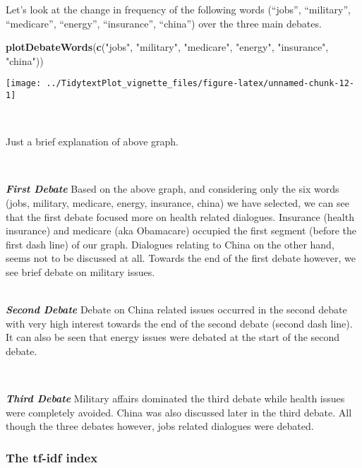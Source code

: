 \documentclass[
]{article}
\newenvironment{Shaded}{\begin{snugshade}}{\end{snugshade}}
\newcommand{\KeywordTok}[1]{\textcolor[rgb]{0.13,0.29,0.53}{\textbf{#1}}}
\newcommand{\NormalTok}[1]{#1}
\newcommand{\StringTok}[1]{\textcolor[rgb]{0.31,0.60,0.02}{#1}}
\begin{document}
Let's look at the change in frequency of the following words (``jobs'',
``military'', ``medicare'', ``energy'', ``insurance'', ``china'') over
the three main debates.

\begin{Shaded}
\begin{Highlighting}[]
\KeywordTok{plotDebateWords}\NormalTok{(}\KeywordTok{c}\NormalTok{(}\StringTok{"jobs"}\NormalTok{, }\StringTok{"military"}\NormalTok{, }\StringTok{"medicare"}\NormalTok{, }\StringTok{"energy"}\NormalTok{, }\StringTok{"insurance"}\NormalTok{, }\StringTok{"china"}\NormalTok{))}
\end{Highlighting}
\end{Shaded}

\begin{center}\texttt{[image: ../TidytextPlot\_vignette\_files/figure-latex/unnamed-chunk-12-1]} \end{center}

~

Just a brief explanation of above graph.

~

\textbf{\emph{First Debate}} Based on the above graph, and considering
only the six words (jobs, military, medicare, energy, insurance, china)
we have selected, we can see that the first debate focused more on
health related dialogues. Insurance (health insurance) and medicare (aka
Obamacare) occupied the first segment (before the first dash line) of
our graph. Dialogues relating to China on the other hand, seems not to
be discussed at all. Towards the end of the first debate however, we see
brief debate on military issues.\\

~

\textbf{\emph{Second Debate}} Debate on China related issues occurred in
the second debate with very high interest towards the end of the second
debate (second dash line). It can also be seen that energy issues were
debated at the start of the second debate.

~

\textbf{\emph{Third Debate}} Military affairs dominated the third debate
while health issues were completely avoided. China was also discussed
later in the third debate. All though the three debates however, jobs
related dialogues were debated.

\hypertarget{the-tf-idf-index}{%
\subsubsection{The tf-idf index}\label{the-tf-idf-index}}
\end{document}
